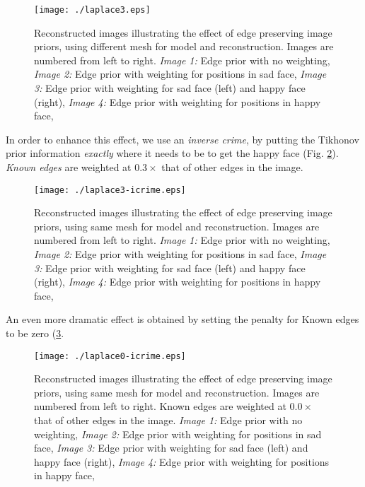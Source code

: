 \documentclass[12pt]{iopart}
\begin{document}
%
%
\begin{figure}[th]
\begin{flushright}
\texttt{[image: ./laplace3.eps]}
\caption{\small 
Reconstructed images illustrating the effect of edge
preserving image priors,
using different mesh for model and reconstruction.
Images are numbered from left to right.
{\em Image 1:} Edge prior with no weighting,
{\em Image 2:} Edge prior with weighting for positions in sad face,
{\em Image 3:} Edge prior with weighting for sad face (left) and
happy face (right),
{\em Image 4:} Edge prior with weighting for positions in happy face,
 }
 \label{fig:laplprior}
\end{flushright}
\end{figure}

In order to enhance this effect, we use an {\em inverse crime},
by putting the Tikhonov prior information {\em exactly} where
it needs to be to get the happy face
(Fig. \ref{fig:laplprior-icrime}).
{\em Known edges} are weighted at $0.3\times$ that of other
edges in the image.

%
%
\begin{figure}[th]
\begin{flushright}
\texttt{[image: ./laplace3-icrime.eps]}
\caption{\small 
Reconstructed images illustrating the effect of edge
preserving image priors,
using same mesh for model and reconstruction.
Images are numbered from left to right.
{\em Image 1:} Edge prior with no weighting,
{\em Image 2:} Edge prior with weighting for positions in sad face,
{\em Image 3:} Edge prior with weighting for sad face (left) and
happy face (right),
{\em Image 4:} Edge prior with weighting for positions in happy face,
 }
 \label{fig:laplprior-icrime}
\end{flushright}
\end{figure}

An even more dramatic effect is obtained by setting the
penalty for Known edges to be zero (\ref{fig:laplprior-icrime0}.

%
%
\begin{figure}[th]
\begin{flushright}
\texttt{[image: ./laplace0-icrime.eps]}
\caption{\small 
Reconstructed images illustrating the effect of edge
preserving image priors,
using same mesh for model and reconstruction.
Images are numbered from left to right.
Known edges are weighted at $0.0\times$ that of other
edges in the image.
{\em Image 1:} Edge prior with no weighting,
{\em Image 2:} Edge prior with weighting for positions in sad face,
{\em Image 3:} Edge prior with weighting for sad face (left) and
happy face (right),
{\em Image 4:} Edge prior with weighting for positions in happy face,
 }
 \label{fig:laplprior-icrime0}
\end{flushright}
\end{figure}
\end{document}

